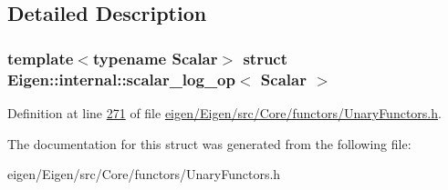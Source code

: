 \subsection{Detailed Description}
\subsubsection*{template$<$typename Scalar$>$\newline
struct Eigen\+::internal\+::scalar\+\_\+log\+\_\+op$<$ Scalar $>$}



Definition at line \hyperlink{eigen_2_eigen_2src_2_core_2functors_2_unary_functors_8h_source_l00271}{271} of file \hyperlink{eigen_2_eigen_2src_2_core_2functors_2_unary_functors_8h_source}{eigen/\+Eigen/src/\+Core/functors/\+Unary\+Functors.\+h}.



The documentation for this struct was generated from the following file\+:\begin{DoxyCompactItemize}
\item 
eigen/\+Eigen/src/\+Core/functors/\+Unary\+Functors.\+h\end{DoxyCompactItemize}
